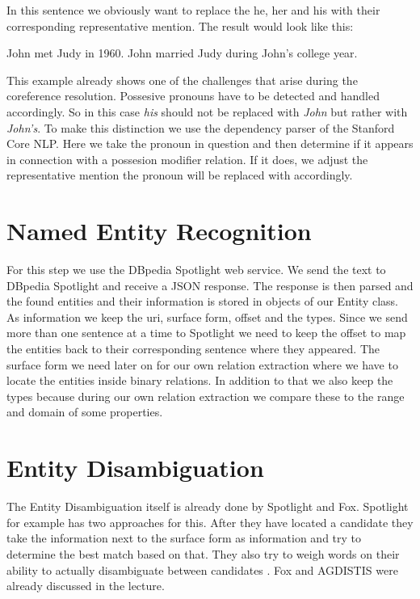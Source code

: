 \documentclass[runningheads]{llncs}
\begin{document}
In this sentence we obviously want to replace the he, her and his with their corresponding representative mention.
The result would look like this: 

\begin{example} John met Judy in 1960. John married Judy during John's college year. \end{example}


This example already shows one of the challenges that arise during the coreference resolution. Possesive pronouns have to be detected and handled accordingly. So in this case \textit{his} should not be replaced with \textit{John} but rather with \textit{John's}. To make this distinction we use the dependency parser \cite{parser} of the Stanford Core NLP. Here we take the pronoun in question and then determine if it appears in connection with a possesion modifier relation. If it does, we adjust the representative mention the pronoun will be replaced with accordingly.



\section{Named Entity Recognition}
For this step we use the DBpedia Spotlight web service. We send the text to DBpedia Spotlight and receive a JSON response. The response is then parsed and the found entities and their information is stored in objects of our Entity class. As information we keep the uri, surface form, offset and the types. Since we send more than one sentence at a time to Spotlight we need to keep the offset to map the entities back to their corresponding sentence where they appeared. The surface form we need later on for our own relation extraction where we have to locate the entities inside binary relations. In addition to that we also keep the types because during our own relation extraction we compare these to the range and domain of some properties.





\section{Entity Disambiguation}
The Entity Disambiguation itself is already done by Spotlight and Fox. Spotlight for example has two approaches for this.
After they have located a candidate they take the information next to the surface form as information and try to determine the best match based on that. They also try to weigh words on their ability to actually disambiguate between candidates \cite{disambiguate}. Fox and AGDISTIS \cite{agdistis} \cite{agdistis2} were already discussed in the lecture.
\end{document}
